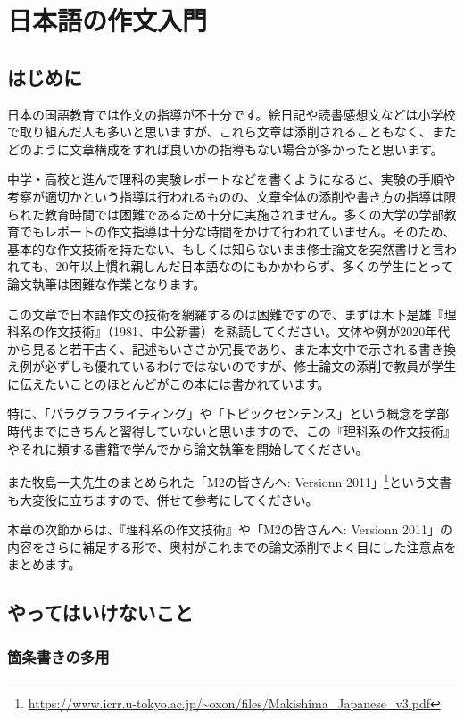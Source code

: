 \chapter{日本語の作文入門}

\section{はじめに}

日本の国語教育では作文の指導が不十分です。絵日記や読書感想文などは小学校で取り組んだ人も多いと思いますが、これら文章は添削されることもなく、またどのように文章構成をすれば良いかの指導もない場合が多かったと思います。

中学・高校と進んで理科の実験レポートなどを書くようになると、実験の手順や考察が適切かという指導は行われるものの、文章全体の添削や書き方の指導は限られた教育時間では困難であるため十分に実施されません。多くの大学の学部教育でもレポートの作文指導は十分な時間をかけて行われていません。そのため、基本的な作文技術を持たない、もしくは知らないまま修士論文を突然書けと言われても、20年以上慣れ親しんだ日本語なのにもかかわらず、多くの学生にとって論文執筆は困難な作業となります。

この文章で日本語作文の技術を網羅するのは困難ですので、まずは木下是雄『理科系の作文技術』（1981、中公新書）を熟読してください。文体や例が2020年代から見ると若干古く、記述もいささか冗長であり、また本文中で示される書き換え例が必ずしも優れているわけではないのですが、修士論文の添削で教員が学生に伝えたいことのほとんどがこの本には書かれています。

特に、「パラグラフライティング」や「トピックセンテンス」という概念を学部時代までにきちんと習得していないと思いますので、この『理科系の作文技術』やそれに類する書籍で学んでから論文執筆を開始してください。

また牧島一夫先生のまとめられた「M2の皆さんへ: Versionn 2011」\footnote{\url{https://www.icrr.u-tokyo.ac.jp/~oxon/files/Makishima_Japanese_v3.pdf}}という文書も大変役に立ちますので、併せて参考にしてください。

本章の次節からは、『理科系の作文技術』や「M2の皆さんへ: Versionn 2011」の内容をさらに補足する形で、奥村がこれまでの論文添削でよく目にした注意点をまとめます。

\section{やってはいけないこと}

\subsection{箇条書きの多用}

